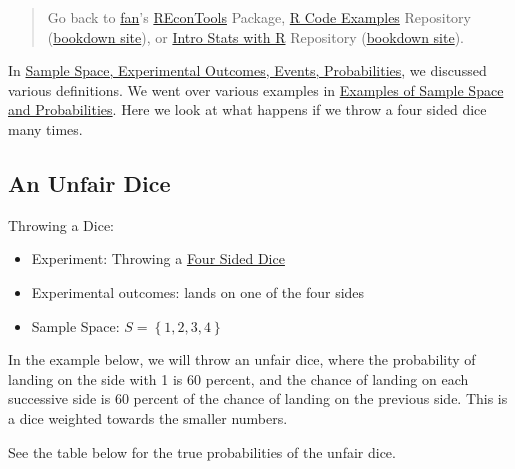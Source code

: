 \documentclass[
]{book}
\providecommand{\tightlist}{%
  \setlength{\itemsep}{0pt}\setlength{\parskip}{0pt}}
\begin{document}
\begin{quote}
Go back to \href{http://fanwangecon.github.io/}{fan}'s \href{https://fanwangecon.github.io/REconTools/}{REconTools} Package, \href{https://fanwangecon.github.io/R4Econ/}{R Code Examples} Repository (\href{https://fanwangecon.github.io/R4Econ/bookdown}{bookdown site}), or \href{https://fanwangecon.github.io/Stat4Econ/}{Intro Stats with R} Repository (\href{https://fanwangecon.github.io/Stat4Econ/bookdown}{bookdown site}).
\end{quote}

In \href{https://fanwangecon.github.io/Stat4Econ/probability/htmlpdfr/samplespace.html}{Sample Space, Experimental Outcomes, Events, Probabilities}, we discussed various definitions. We went over various examples in \href{https://fanwangecon.github.io/Stat4Econ/probability/htmlpdfr/samplespaceexa.html}{Examples of Sample Space and Probabilities}. Here we look at what happens if we throw a four sided dice many times.

\hypertarget{an-unfair-dice}{%
\subsection{An Unfair Dice}\label{an-unfair-dice}}

Throwing a Dice:

\begin{itemize}
\tightlist
\item
  Experiment: Throwing a \href{https://en.wikipedia.org/wiki/Four-sided_die}{Four Sided Dice}
\item
  Experimental outcomes: lands on one of the four sides
\item
  Sample Space: \(S=\left\{1,2,3,4\right\}\)
\end{itemize}

In the example below, we will throw an unfair dice, where the probability of landing on the side with 1 is 60 percent, and the chance of landing on each successive side is 60 percent of the chance of landing on the previous side. This is a dice weighted towards the smaller numbers.

See the table below for the true probabilities of the unfair dice.
\end{document}
